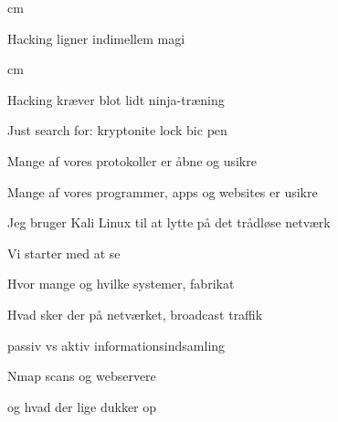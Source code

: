 \documentclass[20pt,landscape,a4paper,footrule]{foils}
\begin{document}


 cm

\centerline{Hacking ligner indimellem  magi}




 cm
\centerline{Hacking kræver blot lidt ninja-træning}




\begin{list1}
\item Just search for: kryptonite lock bic pen
\item {}
\end{list1}






\begin{list1}
\item Mange af vores protokoller er åbne og usikre
\item Mange af vores programmer, apps og websites er usikre
\end{list1}





\begin{list1}
\item Jeg bruger Kali Linux til at lytte på det trådløse netværk
\item Vi starter med at se
\begin{list2}
\item Hvor mange og hvilke systemer, fabrikat
\item Hvad sker der på netværket, broadcast traffik
\item passiv vs aktiv informationsindsamling
\item Nmap scans og webservere
\item og hvad der lige dukker op \smiley
\end{list2}
\end{list1}


\end{document}
